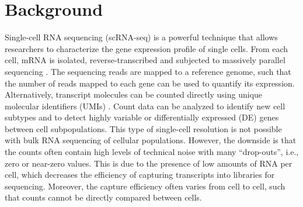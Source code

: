 \documentclass{bmcart}
\begin{document}



\section*{Background}
Single-cell RNA sequencing (scRNA-seq) is a powerful technique that allows researchers to characterize the gene expression profile of single cells.
From each cell, mRNA is isolated, reverse-transcribed and subjected to massively parallel sequencing \cite{stegle2015computational}.
The sequencing reads are mapped to a reference genome, such that the number of reads mapped to each gene can be used to quantify its expression.
Alternatively, transcript molecules can be counted directly using unique molecular identifiers (UMIs) \cite{islam2014quantitative}.
Count data can be analyzed to identify new cell subtypes and to detect highly variable or differentially expressed (DE) genes between cell subpopulations.
This type of single-cell resolution is not possible with bulk RNA sequencing of cellular populations.
However, the downside is that the counts often contain high levels of technical noise with many ``drop-outs'', i.e., zero or near-zero values.
This is due to the presence of low amounts of RNA per cell, which decreases the efficiency of capturing transcripts into libraries for sequencing.
Moreover, the capture efficiency often varies from cell to cell, such that counts cannot be directly compared between cells.
\end{document}
